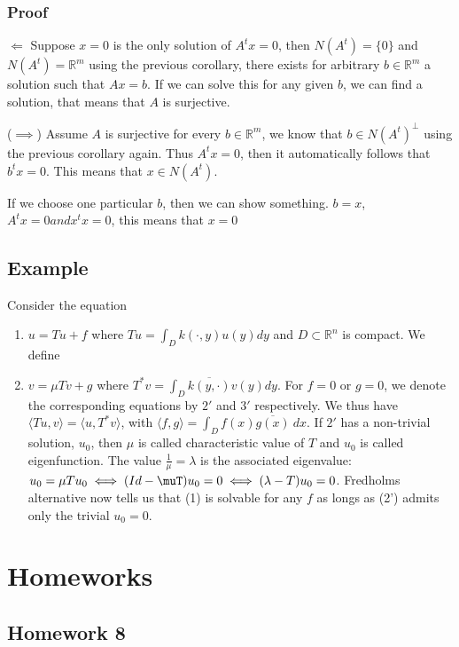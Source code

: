 \documentclass[11pt]{article}
\def\R{\mathbb{R}}
\begin{document}
\subsubsection{Proof}
\label{sec:org738dfe0}
\(\Leftarrow\) Suppose \(x = 0\) is the only solution of \(A^{t}x = 0\), then
\(N(A^{t}) = \{0\}\) and \(N(A^{t}) = \R^m\) using the previous corollary, there
exists for arbitrary \(b \in \R^m\) a solution such that \(Ax = b\). If we can
solve this for any given \(b\), we can find a solution, that means that \(A\) is
surjective.

(\(\implies\)) Assume \(A\) is surjective for every \(b \in \R^m\), we know that
\(b \in N(A^{t})^\perp\) using the previous corollary again. Thus \(A^{t}x =
    0\), then it automatically follows that \(b^{t}x = 0\). This means that \(x\in
    N(A^{t})\).

If we choose one particular \(b\), then we can show something. \(b = x\),
\(A^{t}x = 0 and x^{t}x = 0\), this means that \(x = 0\)
\subsection{Example}
\label{sec:org7c68b80}
Consider the equation 
\begin{enumerate}
\item \(u = Tu + f\) where \(Tu = \int_D k(\cdot, y) u(y) dy\) and \(D \subset \R^n\)
is compact. We define
\item \(v = \mu T v + g\) where \(T^{*}v = \int_D \overline{k(y,\cdot)} v(y) dy\).
For \(f = 0\) or \(g = 0\), we denote the corresponding equations by \(2'\) and
\(3'\) respectively. We thus have \(\langle Tu, v\rangle = \langle u,
      T^{*}v\rangle\), with \(\langle f, g \rangle = \int_D f(x) \overline{g(x)}\
      dx\). If \(2'\) has a non-trivial solution, \(u_0\), then \(\mu\) is called
characteristic value of \(T\) and \(u_0\) is called eigenfunction. The value
\(\frac{1}{\mu} =\lambda\) is the associated eigenvalue: \(u_0 = \mu T u_0
      \iff (Id - \muT) u_0 = 0 \iff (\lambda - T)u_0 = 0\). Fredholms alternative
now tells us that (1) is solvable for any \(f\) as longs as (2') admits only
the trivial \(u_0 = 0\).
\end{enumerate}
\section{Homeworks}
\label{sec:org2d4351c}
\subsection{Homework 8}
\label{sec:org1a9518b}
\end{document}
